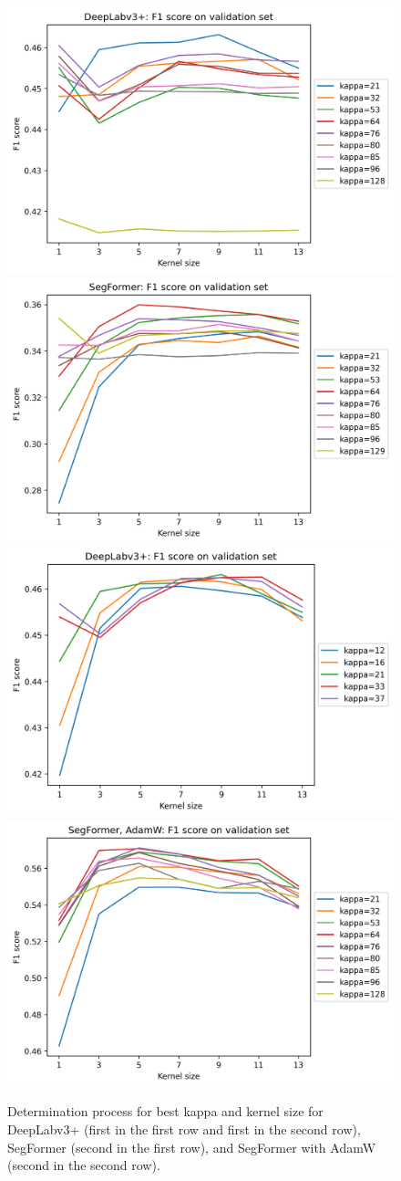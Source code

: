\begin{figure}[h!]
\includegraphics[width=.5\linewidth]{figures/tils/deeplabv3+_f1_kappas_kernels_plot.png}
\includegraphics[width=.5\linewidth]{figures/tils/segformer_f1_kappas_kernels_plot.png}
\includegraphics[width=.5\linewidth]{figures/tils/deeplabv3+_f1_kappas_kernels_plot_zooomed.png}
\includegraphics[width=.5\linewidth]{figures/tils/segformer,_adamw_f1_kappas_kernels_plot.png}
\caption{Determination process for best kappa and kernel size for DeepLabv3+
(first in the first row and first in the second row), SegFormer (second in the first row),
and SegFormer with AdamW (second in the second row).}
\label{fig:kappas}
\end{figure}

